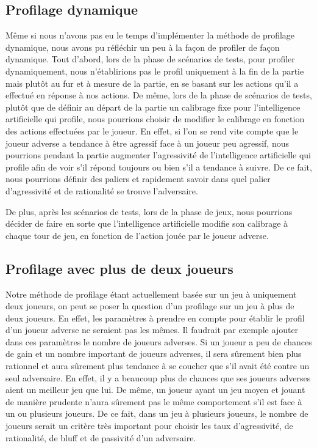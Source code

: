 \documentclass{report}
\begin{document}
\subsection{Profilage dynamique}
\hspace{0.5cm}Même si nous n'avons pas eu le temps d'implémenter la méthode de profilage dynamique, nous avons pu réfléchir un peu à la façon de profiler de façon dynamique. Tout d'abord, lors de la phase de scénarios de tests, pour profiler dynamiquement, nous n'établirions pas le profil uniquement à la fin de la partie mais plutôt au fur et à mesure de la partie, en se basant sur les actions qu'il a effectué en réponse à nos actions. De même, lors de la phase de scénarios de tests, plutôt que de définir au départ de la partie un calibrage fixe pour l'intelligence artificielle qui profile, nous pourrions choisir de modifier le calibrage en fonction des actions effectuées par le joueur. En effet, si l'on se rend vite compte que le joueur adverse a tendance à être agressif face à un joueur peu agressif, nous pourrions pendant la partie augmenter l'agressivité de l'intelligence artificielle qui profile afin de voir s'il répond toujours ou bien s'il a tendance à suivre. De ce fait, nous pourrions définir des paliers et rapidement savoir dans quel palier d'agressivité et de rationalité se trouve l'adversaire.\par
De plus, après les scénarios de tests, lors de la phase de jeux, nous pourrions décider de faire en sorte que l'intelligence artificielle modifie son calibrage à chaque tour de jeu, en fonction de l'action jouée par le joueur adverse.\par

\subsection{Profilage avec plus de deux joueurs}
\hspace{0.5cm}Notre méthode de profilage étant actuellement basée sur un jeu à uniquement deux joueurs, on peut se poser la question d'un profilage sur un jeu à plus de deux joueurs. En effet, les paramètres à prendre en compte pour établir le profil d'un joueur adverse ne seraient pas les mêmes. Il faudrait par exemple ajouter dans ces paramètres le nombre de joueurs adverses. Si un joueur a peu de chances de gain et un nombre important de joueurs adverses, il sera sûrement bien plus rationnel et aura sûrement plus tendance à se coucher que s'il avait été contre un seul adversaire. En effet, il y a beaucoup plus de chances que ses joueurs adverses aient un meilleur jeu que lui. De même, un joueur ayant un jeu moyen et jouant de manière prudente n'aura sûrement pas le même comportement s'il est face à un ou plusieurs joueurs. De ce fait, dans un jeu à plusieurs joueurs, le nombre de joueurs serait un critère très important pour choisir les taux d'agressivité, de rationalité, de bluff et de passivité d'un adversaire. \par
\end{document}
